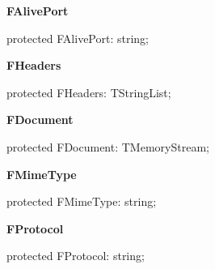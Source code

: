 \documentclass{report}
\newif\ifpdf
\begin{document}
\begin{list}{}
\par  \label{httpsend.THTTPSend-FAlivePort}
\item[\textbf{FAlivePort}\hfill]
\ifpdf
\begin{flushleft}
\fi
\begin{ttfamily}
protected FAlivePort: string;\end{ttfamily}

\ifpdf
\end{flushleft}
\fi


\par  \label{httpsend.THTTPSend-FHeaders}
\item[\textbf{FHeaders}\hfill]
\ifpdf
\begin{flushleft}
\fi
\begin{ttfamily}
protected FHeaders: TStringList;\end{ttfamily}

\ifpdf
\end{flushleft}
\fi


\par  \label{httpsend.THTTPSend-FDocument}
\item[\textbf{FDocument}\hfill]
\ifpdf
\begin{flushleft}
\fi
\begin{ttfamily}
protected FDocument: TMemoryStream;\end{ttfamily}

\ifpdf
\end{flushleft}
\fi


\par  \label{httpsend.THTTPSend-FMimeType}
\item[\textbf{FMimeType}\hfill]
\ifpdf
\begin{flushleft}
\fi
\begin{ttfamily}
protected FMimeType: string;\end{ttfamily}

\ifpdf
\end{flushleft}
\fi


\par  \label{httpsend.THTTPSend-FProtocol}
\item[\textbf{FProtocol}\hfill]
\ifpdf
\begin{flushleft}
\fi
\begin{ttfamily}
protected FProtocol: string;\end{ttfamily}

\ifpdf
\end{flushleft}
\fi



\end{list}
\end{document}
